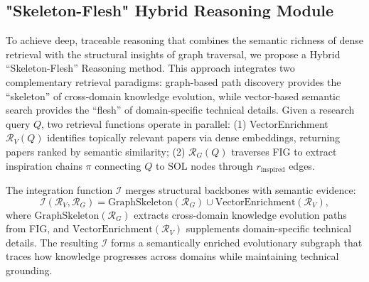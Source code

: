 \documentclass[runningheads]{llncs}
\begin{document}


\subsection{"Skeleton-Flesh" Hybrid Reasoning Module}
\label{sec:hybrid_reasoning}

To achieve deep, traceable reasoning that combines the semantic richness of dense retrieval with the structural insights of graph traversal, we propose a Hybrid ``Skeleton-Flesh'' Reasoning method. This approach integrates two complementary retrieval paradigms: graph-based path discovery provides the ``skeleton'' of cross-domain knowledge evolution, while vector-based semantic search provides the ``flesh'' of domain-specific technical details. Given a research query $Q$, two retrieval functions operate in parallel: (1) VectorEnrichment $\mathcal{R}_V(Q)$ identifies topically relevant papers via dense embeddings, returning papers ranked by semantic similarity; (2)  $\mathcal{R}_G(Q)$ traverses FIG to extract inspiration chains $\pi$ connecting $Q$ to $\text{SOL}$ nodes through $r_{\text{inspired}}$ edges.

The integration function $\mathcal{I}$ merges structural backbones with semantic evidence:
\begin{equation}
    \mathcal{I}(\mathcal{R}_V, \mathcal{R}_G) = \text{GraphSkeleton}(\mathcal{R}_G) \cup \text{VectorEnrichment}(\mathcal{R}_V),
\end{equation}
where $\text{GraphSkeleton}(\mathcal{R}_G)$ extracts cross-domain knowledge evolution paths from FIG, and $\text{VectorEnrichment}(\mathcal{R}_V)$ supplements domain-specific technical details. The resulting $\mathcal{I}$ forms a semantically enriched evolutionary subgraph that traces how knowledge progresses across domains while maintaining technical grounding.
\end{document}
